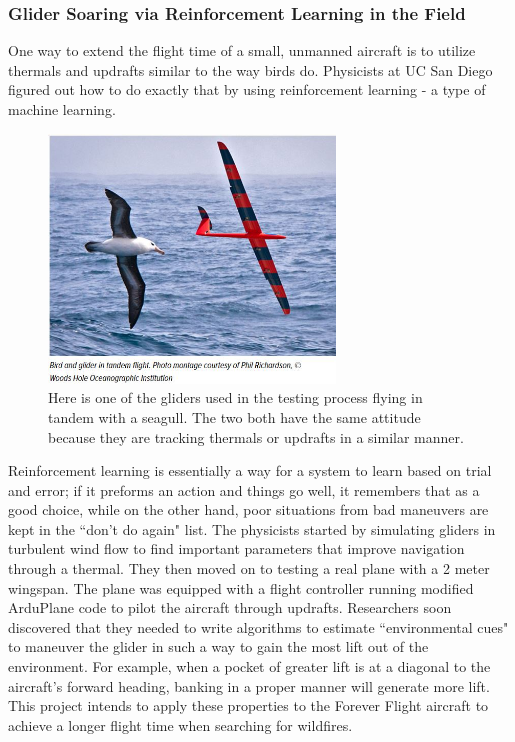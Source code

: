 \documentclass[12pt,journal,compsoc]{IEEEtran}
\begin{document}
\subsubsection{Glider Soaring via Reinforcement Learning in the Field \cite{GliderBirds}}
One way to extend the flight time of a small, unmanned aircraft is to utilize thermals and updrafts similar to the way birds do. Physicists at UC San Diego figured out how to do exactly that by using reinforcement learning - a type of machine learning.
\begin{figure}[h!]
\hspace*{0cm}
\centering
\includegraphics[width=3in]{gliderAndBird.jpg}
\caption{Here is one of the gliders used in the testing process flying in tandem with a seagull. The two both have the same attitude because they are tracking thermals or updrafts in a similar manner. \cite{gbArticle}}
\label{gliderAndBird}
\end{figure}
Reinforcement learning is essentially a way for a system to learn based on trial and error; if it preforms an action and things go well, it remembers that as a good choice, while on the other hand, poor situations from bad maneuvers are kept in the ``don't do again" list. The physicists started by simulating gliders in turbulent wind flow to find important parameters that improve navigation through a thermal. They then moved on to testing a real plane with a 2 meter wingspan. The plane was equipped with a flight controller running modified ArduPlane code to pilot the aircraft through updrafts. Researchers soon discovered that they needed to write algorithms to estimate ``environmental cues" to maneuver the glider in such a way to gain the most lift out of the environment. For example, when a pocket of greater lift is at a diagonal to the aircraft's forward heading, banking in a proper manner will generate more lift. This project intends to apply these properties to the Forever Flight aircraft to achieve a longer flight time when searching for wildfires.
\end{document}
